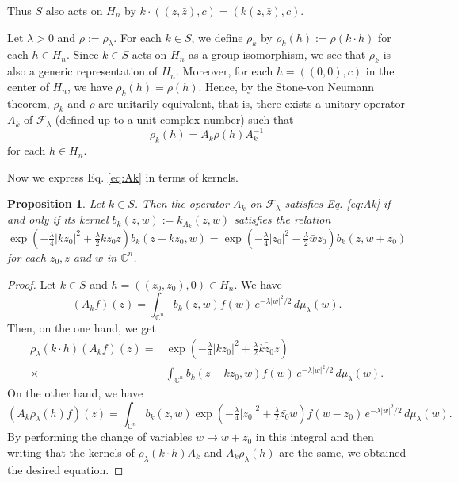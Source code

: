 \documentclass[12pt]{amsart}
\numberwithin{equation}{section}
\newtheorem{proposition}[theorem]{Proposition}
\begin{document}
Thus $S$ also acts on $H_n$ by $k\cdot ((z,{\bar z}),c)=(k(z,{\bar
z}),c)$. 

Let $\lambda >0$ and $\rho:=\rho_{\lambda}$. For each $k\in S$, we define
$\rho_k$ by $\rho_k(h):=\rho(k\cdot h)$ for each $h\in H_n$. Since $k\in S$ acts on $H_n$
as a group isomorphism, we see that $\rho_k$ is also a generic representation of $H_n$.
Moreover, for each $h=((0,0),c)$
in the center of $H_n$, we have $\rho_k(h)=\rho(h)$. Hence, by the Stone-von Neumann
theorem, $\rho_k$ and $\rho$ are unitarily equivalent, that is, there exists a unitary operator
$A_k$ of ${\mathcal F}_{\lambda}$ (defined up to a unit complex number) such that
\begin{equation}\label{eq:Ak}\rho_k(h)=A_k\rho (h)A_k^{-1}\end{equation}
for each $h\in H_n$. 

Now we express Eq. \ref{eq:Ak} in terms of kernels.

\begin{proposition} \label{prop:relatker1} Let $k\in S$. Then the operator $A_k$ 
on ${\mathcal F}_{\lambda}$ satisfies Eq. \ref{eq:Ak} if and only if
its kernel $b_k(z,w):=k_{A_k}(z,w)$ satisfies the relation
\begin{equation}\label{eq:relatker1}
\exp  \left( -\tfrac{\lambda}{4}\vert kz_0\vert^2+\tfrac{\lambda}{2}\overline{kz_0}z\right)b_k(z-kz_0,w)
=\exp \left( -\tfrac{\lambda}{4}\vert z_0\vert^2-\tfrac{\lambda}{2}\bar{w}z_0\right)
b_k(z, w+z_0)
\end{equation}
for each $z_0,z$ and $w$ in ${\mathbb C}^n$.
\end{proposition}

\begin{proof} Let $k\in S$ and $h=((z_0,{\bar z}_0),0)\in H_n$. We have
\begin{equation*}(A_kf)(z)=\int_{{\mathbb C}^n}b_k(z, w)f(w)\,
e^{-\lambda \vert
w\vert^2/2}\,d\mu_{\lambda} (w).
\end{equation*} Then, on the one hand, we get
\begin{align*}\rho_{\lambda}(k\cdot h)(A_kf)(z)=&\exp  \left( -\tfrac{\lambda}{4}\vert kz_0\vert^2+\tfrac{\lambda}{2}\overline{kz_0}z\right)\\
\times & \int_{{\mathbb C}^n}b_k(z-kz_0, w)f(w)\,
e^{-\lambda \vert
w\vert^2/2}\,d\mu_{\lambda} (w).
\end{align*}
On the other hand, we have
\begin{equation*}(A_k\rho_{\lambda} (h)f)(z)=
 \int_{{\mathbb C}^n}b_k(z, w)\exp  \left( -\tfrac{\lambda}{4}\vert z_0\vert^2+\tfrac{\lambda}{2}\bar{z_0}w\right) f(w-z_0)\,
e^{-\lambda \vert
w\vert^2/2}\,d\mu_{\lambda} (w).
\end{equation*}
By performing the change of variables $w\rightarrow w+z_0$ in this integral and then writing
that the kernels of $\rho_{\lambda} (k\cdot h)A_k$ and $A_k\rho_{\lambda} (h)$ are the same, we obtained the desired equation.
\end{proof}
\end{document}
